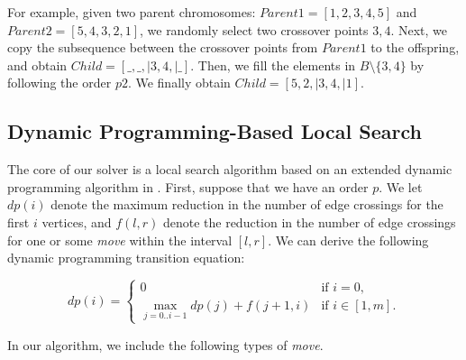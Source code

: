 \documentclass[a4paper,ctexart,UKenglish,cleveref, autoref, thm-restate]{lipics-v2021}
\begin{document}
For example, given two parent chromosomes: $Parent1 = [1,2,3,4,5]$ and $ Parent2 = [5,4,3,2,1]$, we randomly select two crossover points $3,4$. Next, we copy the subsequence between the crossover points from $Parent1$ to the offspring, and obtain $Child = [\_,\_,|3,4,|\_]$. Then, we fill the elements in $B\setminus \{3,4\}$ by following the order $p2$. We finally obtain $Child = [5, 2,| 3, 4,| 1]$.




\subsection{Dynamic Programming-Based Local Search}

The core of our solver is a local search algorithm based on an extended dynamic programming algorithm in \cite{pb}.
First, suppose that we have an order $p$. 
We let $dp(i)$ denote the maximum reduction in the number of edge crossings for the first $i$ vertices, and $f(l,r)$ denote the reduction in the number of edge crossings for one or some \textit{move} within the interval $[l,r]$. We can derive the following dynamic programming transition equation:

$$
dp(i) = 
\begin{cases}   
0 & \text{if } i = 0, \\
\max_{j=0..i-1}dp(j)+f(j+1,i) & \text{if } i\in[1,m]. 
\end{cases}
$$

In our algorithm, we include the following types of \textit{move}. 
\end{document}
